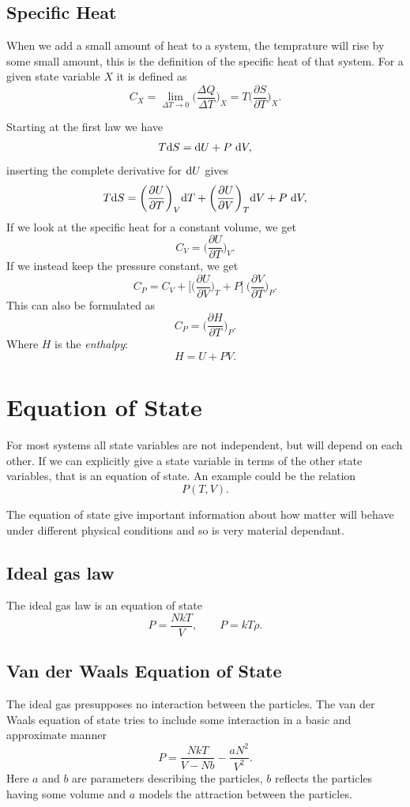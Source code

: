 \documentclass[a4paper, 11pt, notitlepage, english]{article}
\renewcommand{\d}{{\rm d}}
\renewcommand{\b}{\bigg}
\newcommand{\p}{\partial}
\begin{document}
\subsection*{Specific Heat}
When we add a small amount of heat to a system, the temprature will rise by some small amount, this is the definition of the specific heat of that system. For a given state variable $X$ it is defined as
$$C_X = \lim_{\Delta T \to 0} \b(\frac{\Delta Q}{\Delta T}\b)_X = T \b(\frac{\p S}{\p T}\b)_X.$$

Starting at the first law we have
$$T \d S = \d U + P\ \d V,$$
inserting the complete derivative for $\d U$ gives
$$T \d S = \b(\frac{\p U}{\p T}\b)_V \d T + \b(\frac{\p U}{\p V}\b)_T \d V + P\ \d V,$$
If we look at the specific heat for a constant volume, we get
$$C_V = \b(\frac{\p U}{\p T}\b)_V.$$
If we instead keep the pressure constant, we get
$$C_P = C_V + \b[\b(\frac{\p U}{\p V}\b)_T + P\b]\ \b(\frac{\p V}{\p T}\b)_P.$$
This can also be formulated as
$$C_P = \b(\frac{\p H}{\p T}\b)_P.$$
Where $H$ is the \emph{enthalpy}:
$$H = U + PV.$$

\section*{Equation of State}
For most systems all state variables are not independent, but will depend on each other. If we can explicitly give a state variable in terms of the other state variables, that is an equation of state. An example could be the relation $$P(T,V).$$
 
The equation of state give important information about how matter will behave under different physical conditions and so is very material dependant.

\subsection*{Ideal gas law}
The ideal gas law is an equation of state
$$P = \frac{NkT}{V}, \qquad P = kT\rho.$$

\subsection*{Van der Waals Equation of State}
The ideal gas presupposes no interaction between the particles. The van der Waals equation of state tries to include some interaction in a basic and approximate manner
$$P = \frac{NkT}{V - Nb} - \frac{aN^2}{V^2}.$$
Here $a$ and $b$ are parameters describing the particles, $b$ reflects the particles having some volume and $a$ models the attraction between the particles.
\end{document}
